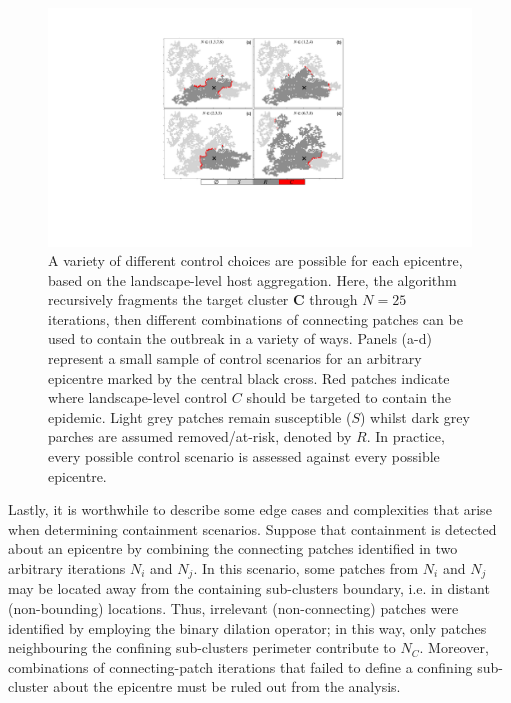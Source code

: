 \begin{figure}
    \centering
    \includegraphics[scale=0.575]{chapter7/figures/figure3-scenario-test.pdf}
    \caption{
    A variety of different control choices are possible for each epicentre, based on the landscape-level host aggregation. 
    Here, the algorithm recursively fragments the target cluster $\mathbf{C}$ through $N=25$ iterations, 
    then different combinations of connecting patches can be used to contain the outbreak in a variety of ways.
    Panels (a-d) represent a small sample of control scenarios for an arbitrary epicentre marked by the central black cross.
    Red patches indicate where landscape-level control $C$ should be targeted to contain the epidemic.
    Light grey patches remain susceptible ($S$) whilst dark grey parches are assumed removed/at-risk, denoted by $R$.
    In practice, every possible control scenario is assessed against every possible epicentre.
     }
    \label{fig:scenario-expo}
\end{figure}

Lastly, it is worthwhile to describe some edge cases and complexities that arise when determining containment scenarios.
Suppose that containment is detected about an epicentre by combining the connecting patches identified in two arbitrary iterations $N_i$ and $N_j$.
In this scenario, some patches from $N_i$ and $N_j$ may be located away from the containing sub-clusters boundary, i.e. in distant (non-bounding) locations.
Thus, irrelevant (non-connecting) patches were identified by employing the binary dilation operator; in this way, only patches neighbouring the confining sub-clusters perimeter contribute to $N_C$.
Moreover, combinations of connecting-patch iterations that failed to define a confining sub-cluster about the epicentre must be ruled out from the analysis.

